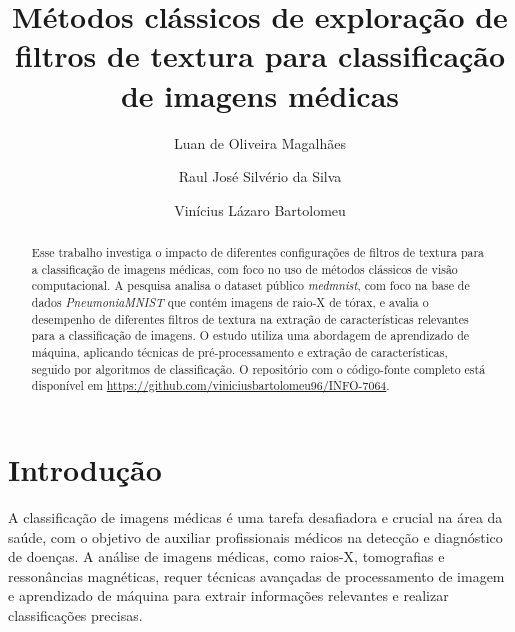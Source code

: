 \documentclass[sigconf,nonacm]{acmart}
\begin{document}
\title{Métodos clássicos de exploração de filtros de textura para classificação de imagens médicas}


\author{Luan de Oliveira Magalhães}

\author{Raul José Silvério da Silva}

\author{Vinícius Lázaro Bartolomeu}

\begin{abstract}
  Esse trabalho investiga o impacto de diferentes configurações de filtros de textura para a classificação de imagens médicas, com foco no uso de métodos clássicos de visão computacional.
  A pesquisa analisa o dataset público \textit{medmnist}, com foco na base de dados \textit{PneumoniaMNIST} que contém imagens de raio-X de tórax, e avalia o desempenho de diferentes filtros de textura na extração de características relevantes para a classificação de imagens.
  O estudo utiliza uma abordagem de aprendizado de máquina, aplicando técnicas de pré-processamento e extração de características, seguido por algoritmos de classificação.
  O repositório com o código-fonte completo está disponível em \url{https://github.com/viniciusbartolomeu96/INFO-7064}.
\end{abstract}


\maketitle

\section{Introdução}
A classificação de imagens médicas é uma tarefa desafiadora e crucial na área da saúde, com o objetivo de auxiliar profissionais médicos na detecção e diagnóstico de doenças. A análise de imagens médicas, como raios-X, tomografias e ressonâncias magnéticas, requer técnicas avançadas de processamento de imagem e aprendizado de máquina para extrair informações relevantes e realizar classificações precisas.
\end{document}
